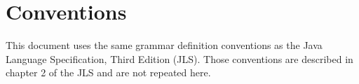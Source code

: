\section{Conventions}

This document uses the same grammar definition conventions as the Java
Language Specification, Third Edition (JLS).  Those conventions
are described in chapter 2 of the JLS and are not repeated here.


